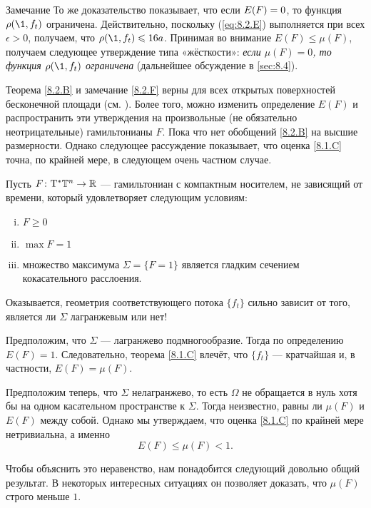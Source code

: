 \begin{ex}{Замечание}\label{8.2.F}
То же доказательство показывает, что если $E (F) \z= 0$, то функция
$\rho (\1, f_t)$ ограничена. 
Действительно, поскольку (\ref{eq:8.2.E}) выполняется при всех
$\epsilon> 0$, получаем, что $\rho (\1, f_t) \z\le 16a$. 
Принимая во внимание $E (F) \le \mu (F)$, получаем следующее
утверждение типа «жёсткости»: \textit{если $\mu (F) = 0$, то функция $\rho
(\1, f_t)$ ограничена} (дальнейшее обсуждение в \ref{sec:8.4}). 
\end{ex}

Теорема \ref{8.2.B} и замечание \ref{8.2.F} верны для всех открытых
поверхностей бесконечной площади (см. \cite{PS}). 
Более того, можно изменить определение $E (F)$ и распространить эти
утверждения на произвольные (не обязательно неотрицательные)
гамильтонианы $F$. 
Пока что нет обобщений \ref{8.2.B} на высшие размерности.
Однако следующее рассуждение показывает, что оценка \ref{8.1.C} точна,
по крайней мере, в следующем очень частном случае. 

Пусть $F\colon \mathrm{T}^\ast \mathbb{T}^n \to \mathbb{R}$ — гамильтониан с компактным носителем, не зависящий от времени, который удовлетворяет следующим условиям: 
\begin{enumerate}[(i)]
\item $F \ge 0 $
\item $\max F = 1$ 
\item множество максимума $\Sigma =\{F = 1\}$ является гладким сечением кокасательного расслоения. 
\end{enumerate}

Оказывается, геометрия соответствующего потока $\{f_t\}$ сильно
зависит от того, является ли $\Sigma$ лагранжевым или нет! 

Предположим, что $\Sigma$ — лагранжево подмногообразие.
Тогда по определению $E (F) = 1$.
Следовательно, теорема \ref{8.1.C} влечёт, что $\{f_t\}$ —
кратчайшая и, в частности, $E (F) = \mu (F)$. 

Предположим теперь, что $\Sigma$ нелагранжево, то есть $\Omega$ не
обращается в нуль хотя бы на одном касательном пространстве к
$\Sigma$. 
Тогда неизвестно, равны ли $\mu (F)$ и $E (F)$ между собой.
Однако мы утверждаем, что оценка \ref{8.1.C} по крайней мере
нетривиальна, а именно  
\begin{equation}
E (F) \le \mu (F) <1.\label{8.2.G}
\end{equation}

Чтобы объяснить это неравенство, нам понадобится следующий довольно общий результат.
В некоторых интересных ситуациях он позволяет доказать, что $\mu(F)$ строго меньше $1$. 

